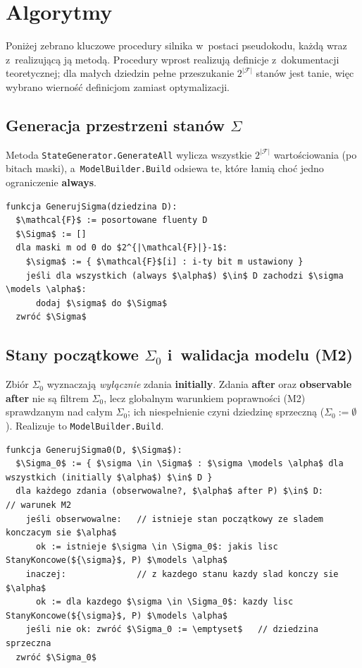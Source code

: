 \documentclass[11pt,a4paper]{article}
\begin{document}
\section{Algorytmy}
\label{sec:alg}

Poniżej zebrano kluczowe procedury silnika w~postaci pseudokodu, każdą wraz
z~realizującą ją metodą. Procedury wprost realizują definicje z~dokumentacji
teoretycznej; dla małych dziedzin pełne przeszukanie $2^{|\mathcal{F}|}$ stanów
jest tanie, więc wybrano wierność definicjom zamiast optymalizacji.

\subsection{Generacja przestrzeni stanów $\Sigma$}
Metoda \texttt{StateGenerator.GenerateAll} wylicza wszystkie $2^{|\mathcal{F}|}$
wartościowania (po bitach maski), a~\texttt{ModelBuilder.Build} odsiewa te,
które łamią choć jedno ograniczenie \textbf{always}.

\begin{lstlisting}[style=ds4pseudo]
funkcja GenerujSigma(dziedzina D):
  $\mathcal{F}$ := posortowane fluenty D
  $\Sigma$ := []
  dla maski m od 0 do $2^{|\mathcal{F}|}-1$:
    $\sigma$ := { $\mathcal{F}$[i] : i-ty bit m ustawiony }
    jeśli dla wszystkich (always $\alpha$) $\in$ D zachodzi $\sigma \models \alpha$:
      dodaj $\sigma$ do $\Sigma$
  zwróć $\Sigma$
\end{lstlisting}

\subsection{Stany początkowe $\Sigma_0$ i~walidacja modelu (M2)}
Zbiór $\Sigma_0$ wyznaczają \emph{wyłącznie} zdania \textbf{initially}. Zdania
\textbf{after} oraz \textbf{observable after} nie są filtrem $\Sigma_0$, lecz
globalnym warunkiem poprawności (M2) sprawdzanym nad całym $\Sigma_0$; ich
niespełnienie czyni dziedzinę sprzeczną ($\Sigma_0 := \emptyset$). Realizuje to
\texttt{ModelBuilder.Build}.

\begin{lstlisting}[style=ds4pseudo]
funkcja GenerujSigma0(D, $\Sigma$):
  $\Sigma_0$ := { $\sigma \in \Sigma$ : $\sigma \models \alpha$ dla wszystkich (initially $\alpha$) $\in$ D }
  dla każdego zdania (obserwowalne?, $\alpha$ after P) $\in$ D:        // warunek M2
    jeśli obserwowalne:   // istnieje stan początkowy ze sladem konczacym sie $\alpha$
      ok := istnieje $\sigma \in \Sigma_0$: jakis lisc StanyKoncowe(${\sigma}$, P) $\models \alpha$
    inaczej:              // z kazdego stanu kazdy slad konczy sie $\alpha$
      ok := dla kazdego $\sigma \in \Sigma_0$: kazdy lisc StanyKoncowe(${\sigma}$, P) $\models \alpha$
    jeśli nie ok: zwróć $\Sigma_0 := \emptyset$   // dziedzina sprzeczna
  zwróć $\Sigma_0$
\end{lstlisting}
\end{document}
